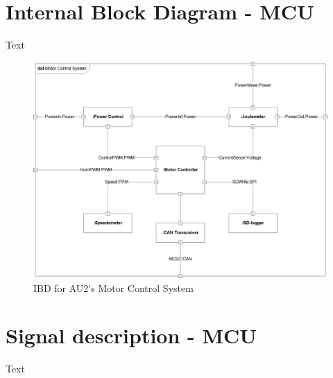 \section{Internal Block Diagram - MCU}
Text

\begin{figure}[H]
	\centering
	\includegraphics[width=1\linewidth]{Architecture/Diagrams/IBD_MCS}
	\caption{IBD for AU2's Motor Control System}
	\label{fig:IBD_MCS}
\end{figure}

\section{Signal description - MCU}
Text